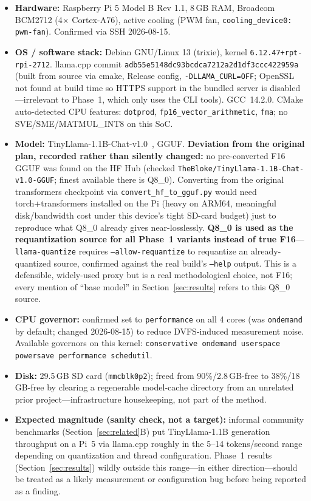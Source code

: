 \documentclass[journal]{IEEEtran}
\begin{document}
\begin{itemize}
  \item \textbf{Hardware:} Raspberry Pi 5 Model B Rev 1.1, 8\,GB RAM, Broadcom BCM2712 (4$\times$ Cortex-A76), active cooling (PWM fan, \texttt{cooling\_device0: pwm-fan}). Confirmed via SSH 2026-08-15.
  \item \textbf{OS / software stack:} Debian GNU/Linux 13 (trixie), kernel \texttt{6.12.47+rpt-rpi-2712}. llama.cpp commit \texttt{adb55e5148dc93bcdca7212a2d1df3ccc422959a} (built from source via cmake, Release config, \texttt{-DLLAMA\_CURL=OFF}; OpenSSL not found at build time so HTTPS support in the bundled server is disabled---irrelevant to Phase~1, which only uses the CLI tools). GCC~14.2.0. CMake auto-detected CPU features: \texttt{dotprod}, \texttt{fp16\_vector\_arithmetic}, \texttt{fma}; no SVE/SME/MATMUL\_INT8 on this SoC.
  \item \textbf{Model:} TinyLlama-1.1B-Chat-v1.0~\cite{ref1}, GGUF. \textbf{Deviation from the original plan, recorded rather than silently changed:} no pre-converted F16 GGUF was found on the HF Hub (checked \texttt{TheBloke/TinyLlama-1.1B-Chat-v1.0-GGUF}; finest available there is Q8\_0). Converting from the original transformers checkpoint via \texttt{convert\_hf\_to\_gguf.py} would need torch+transformers installed on the Pi (heavy on ARM64, meaningful disk/bandwidth cost under this device's tight SD-card budget) just to reproduce what Q8\_0 already gives near-losslessly. \textbf{Q8\_0 is used as the requantization source for all Phase~1 variants instead of true F16}---\texttt{llama-quantize} requires \texttt{--allow-requantize} to requantize an already-quantized source, confirmed against the real build's \texttt{--help} output. This is a defensible, widely-used proxy but is a real methodological choice, not F16; every mention of ``base model'' in Section~\ref{sec:results} refers to this Q8\_0 source.
  \item \textbf{CPU governor:} confirmed set to \texttt{performance} on all 4 cores (was \texttt{ondemand} by default; changed 2026-08-15) to reduce DVFS-induced measurement noise. Available governors on this kernel: \texttt{conservative ondemand userspace powersave performance schedutil}.
  \item \textbf{Disk:} 29.5\,GB SD card (\texttt{mmcblk0p2}); freed from 90\%/2.8\,GB-free to 38\%/18\,GB-free by clearing a regenerable model-cache directory from an unrelated prior project---infrastructure housekeeping, not part of the method.
  \item \textbf{Expected magnitude (sanity check, not a target):} informal community benchmarks (Section~\ref{sec:related}B) put TinyLlama-1.1B generation throughput on a Pi~5 via llama.cpp roughly in the 5--14 tokens/second range depending on quantization and thread configuration. Phase~1 results (Section~\ref{sec:results}) wildly outside this range---in either direction---should be treated as a likely measurement or configuration bug before being reported as a finding.
\end{itemize}
\end{document}
